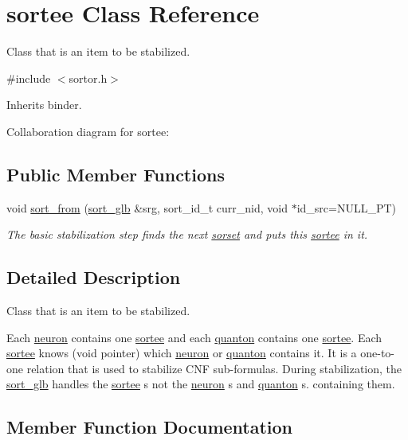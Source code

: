 \hypertarget{classsortee}{}\section{sortee Class Reference}
\label{classsortee}


Class that is an item to be stabilized.  




{\ttfamily \#include $<$sortor.\+h$>$}



Inherits binder.



Collaboration diagram for sortee\+:
\subsection*{Public Member Functions}
\begin{DoxyCompactItemize}
\item 
void \hyperlink{classsortee_a5cc113e22e62dfcb3869c2786ae5345e}{sort\+\_\+from} (\hyperlink{classsort__glb}{sort\+\_\+glb} \&srg, sort\+\_\+id\+\_\+t curr\+\_\+nid, void $\ast$id\+\_\+src=N\+U\+L\+L\+\_\+\+PT)
\begin{DoxyCompactList}\small\item\em The basic stabilization step finds the next \hyperlink{classsorset}{sorset} and puts this \hyperlink{classsortee}{sortee} in it. \end{DoxyCompactList}\end{DoxyCompactItemize}


\subsection{Detailed Description}
Class that is an item to be stabilized. 

Each \hyperlink{classneuron}{neuron} contains one \hyperlink{classsortee}{sortee} and each \hyperlink{classquanton}{quanton} contains one \hyperlink{classsortee}{sortee}. Each \hyperlink{classsortee}{sortee} \textquotesingle{}knows\textquotesingle{} (void pointer) which \hyperlink{classneuron}{neuron} or \hyperlink{classquanton}{quanton} contains it. It is a one-\/to-\/one relation that is used to stabilize C\+NF sub-\/formulas. During stabilization, the \hyperlink{classsort__glb}{sort\+\_\+glb} handles the \hyperlink{classsortee}{sortee} s not the \hyperlink{classneuron}{neuron} s and \hyperlink{classquanton}{quanton} s. containing them. 

\subsection{Member Function Documentation}
